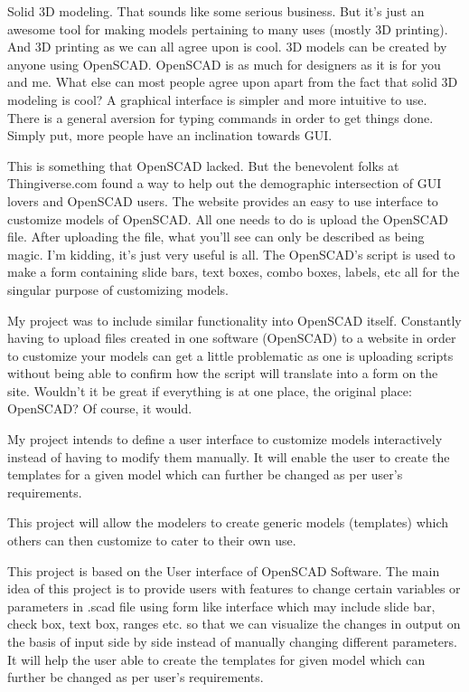 \documentclass[12pt,includeheadfoot,a4paper]{report}
\begin{document}
Solid 3D modeling. That sounds like some serious business. But it’s just an awesome tool for making models pertaining to many uses (mostly 3D printing). And 3D printing as we can all agree upon is cool. 3D models can be created by anyone using OpenSCAD. OpenSCAD is as much for designers as it is for you and me. What else can most people agree upon apart from the fact that solid 3D modeling is cool? A graphical interface is simpler and more intuitive to use. There is a general aversion for typing commands in order to get things done. Simply put, more people have an inclination towards GUI.

This is something that OpenSCAD lacked. But the benevolent folks at Thingiverse.com found a way to help out the demographic intersection of GUI lovers and OpenSCAD users. The website provides an easy to use interface to customize models of OpenSCAD. All one needs to do is upload the OpenSCAD file. After uploading the file, what you’ll see can only be described as being magic. I’m kidding, it’s just very useful is all. The OpenSCAD’s script is used to make a form containing slide bars, text boxes, combo boxes, labels, etc all for the singular purpose of customizing models.

My project was to include similar functionality into OpenSCAD itself. Constantly having to upload files created in one software (OpenSCAD) to a website in order to customize your models can get a little problematic as one is uploading scripts without being able to confirm how the script will translate into a form on the site. Wouldn’t it be great if everything is at one place, the original place: OpenSCAD? Of course, it would.

My project intends to define a user interface to customize models interactively instead of having to modify them manually. It will enable the user to create the templates for a given model which can further be changed as per user’s requirements.

This project will allow the modelers to create generic models (templates) which others can then customize to cater to their own use.

This project is based on the User interface of OpenSCAD Software. The main idea of this project is to provide users with features to change certain variables or parameters in .scad file using form like interface which may include slide bar, check box, text box, ranges etc. so that we can visualize the changes in output on the basis of input side by side instead of manually changing different parameters. It will help the user able to create the templates for given model which can further be changed as per user's requirements.
\end{document}
